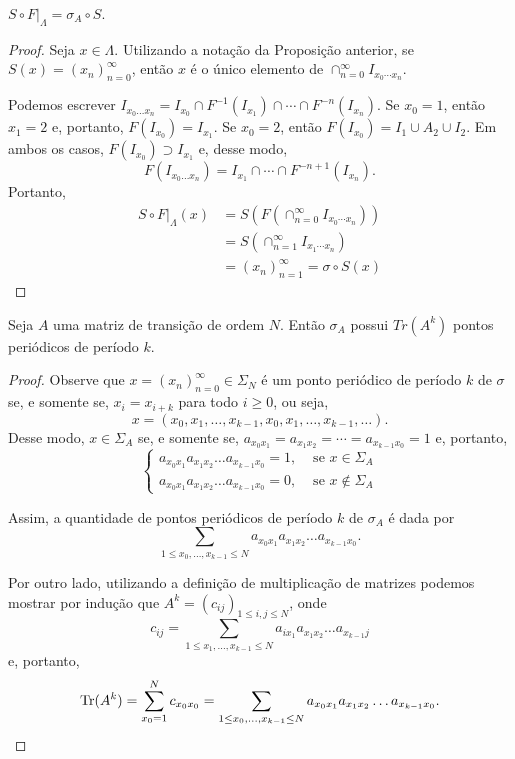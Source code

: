 \begin{theorem}
$S \circ F|_\Lambda = \sigma_A \circ S$.
\end{theorem}


\begin{proof}
Seja $x \in \Lambda$. Utilizando a notação da Proposição anterior, se $S(x) = (x_n)_{n=0}^\infty$, então $x$ é o único elemento de $\cap_{n=0}^\infty I_{x_0 \cdots x_n}$.

Podemos escrever $I_{x_0 \dots x_n} = I_{x_0} \cap F^{-1}(I_{x_1}) \cap \cdots \cap F^{-n}(I_{x_n})$. Se $x_0 = 1$, então $x_1 = 2$ e, portanto, $F(I_{x_0}) = I_{x_1}$. Se $x_0 = 2$, então $F(I_{x_0}) = I_1 \cup A_2 \cup I_2$. Em ambos os casos, $F(I_{x_0}) \supset I_{x_1}$ e, desse modo,
$$F(I_{x_0 \dots x_n}) = I_{x_1} \cap \cdots \cap F^{-n+1}(I_{x_n}).$$
Portanto,
\begin{align*}
S \circ F|_{\Lambda}(x) & = S(F(\cap_{n=0}^\infty I_{x_0 \cdots x_n})) \\
& = S(\cap_{n=1}^\infty I_{x_1 \cdots x_n}) \\
& = (x_n)_{n=1}^\infty  = \sigma \circ S(x)
\end{align*}
\end{proof}


\begin{proposition}
Seja $A$ uma matriz de transição de ordem $N$. Então $\sigma_A$ possui $Tr(A^k)$ pontos periódicos de período $k$.
\end{proposition}


\begin{proof}
Observe que $x = (x_n)_{n=0}^\infty \in \Sigma_N$ é um ponto periódico de período $k$ de $\sigma$ se, e somente se, $x_i = x_{i+k}$ para todo $i \geq 0$, ou seja,
$$x = (x_0, x_1, \dots, x_{k-1}, x_0, x_1, \dots, x_{k-1}, \dots).$$
Desse modo, $x \in \Sigma_A$ se, e somente se, $a_{x_0 x_1} = a_{x_1 x_2} = \cdots = a_{x_{k-1} x_0} = 1$ e, portanto,
\[\begin{cases} 
  a_{x_0 x_1} a_{x_1 x_2}  \dots a_{x_{k-1} x_0} = 1, & \textrm{ se } x \in \Sigma_A \\
  a_{x_0 x_1} a_{x_1 x_2}  \dots a_{x_{k-1} x_0} = 0, & \textrm{ se } x \notin \Sigma_A 
  \end{cases}
\]

Assim, a quantidade de pontos periódicos de período $k$ de $\sigma_A$ é dada por
$$\sum_{1 \leq x_0, \dots, x_{k-1} \leq N} a_{x_0 x_1} a_{x_1 x_2}  \dots a_{x_{k-1} x_0}.$$

Por outro lado, utilizando a definição de multiplicação de matrizes podemos mostrar por indução que $A^k = (c_{ij})_{1 \leq i, j \leq N}$, onde
$$c_{ij} = \sum_{1 \leq x_1, \dots, x_{k-1} \leq N} a_{i x_1} a_{x_1 x_2}  \dots a_{x_{k-1}j}$$
e, portanto,
$$\operatorname{Tr}(A^k) = \sum_{x_0 = 1}^N c_{x_0 x_0} = \sum_{1 \leq x_0, \dots, x_{k-1} \leq N} a_{x_0 x_1} a_{x_1 x_2}  \dots a_{x_{k-1} x_0}.$$
\end{proof}











